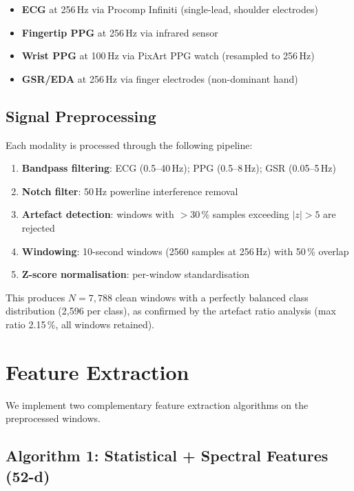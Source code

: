 \documentclass[conference]{IEEEtran}
\begin{document}
\begin{itemize}
    \item \textbf{ECG} at 256\,Hz via Procomp Infiniti (single-lead, shoulder electrodes)
    \item \textbf{Fingertip PPG} at 256\,Hz via infrared sensor
    \item \textbf{Wrist PPG} at 100\,Hz via PixArt PPG watch (resampled to 256\,Hz)
    \item \textbf{GSR/EDA} at 256\,Hz via finger electrodes (non-dominant hand)
\end{itemize}

\subsection{Signal Preprocessing}

Each modality is processed through the following pipeline:
\begin{enumerate}
    \item \textbf{Bandpass filtering}: ECG (0.5--40\,Hz); PPG (0.5--8\,Hz); GSR (0.05--5\,Hz)
    \item \textbf{Notch filter}: 50\,Hz powerline interference removal
    \item \textbf{Artefact detection}: windows with $>$30\,\% samples exceeding $|z|>5$ are rejected
    \item \textbf{Windowing}: 10-second windows (2560 samples at 256\,Hz) with 50\,\% overlap
    \item \textbf{Z-score normalisation}: per-window standardisation
\end{enumerate}

This produces $N=7{,}788$ clean windows with a perfectly balanced class distribution (2,596 per class), as confirmed by the artefact ratio analysis (max ratio 2.15\,\%, all windows retained).

\section{Feature Extraction}
\label{sec:features}

We implement two complementary feature extraction algorithms on the preprocessed windows.

\subsection{Algorithm 1: Statistical + Spectral Features (52-d)}
\end{document}
